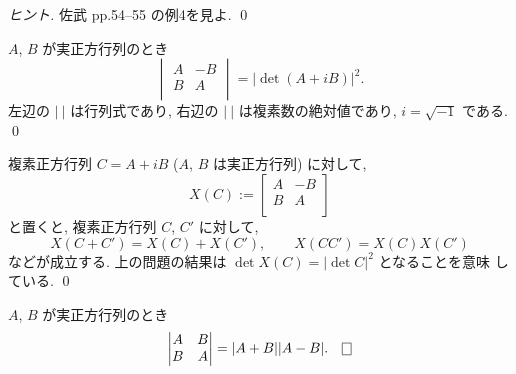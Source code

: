 \documentclass[12pt,twoside]{jarticle}
\begin{document}
\begin{proof}[ヒント]
  佐武 \cite{satake} pp.54--55 の例4を見よ. \qed
\end{proof}


\begin{question}[複素行列を表現する実行列の行列式]
  \label{q:det-A-BBA}
  $A$, $B$ が実正方行列のとき
  \begin{equation*}
    \begin{vmatrix}
      A & -B \\
      B & A  \\
    \end{vmatrix}
    = |\det(A+iB)|^2.
  \end{equation*}
  左辺の $|\ |$ は行列式であり, 
  右辺の $|\ |$ は複素数の絶対値であり, $i=\sqrt{-1}$ である. \qed
\end{question}

\begin{guide}
  複素正方行列 $C = A + iB$ ($A$, $B$ は実正方行列) に対して,
  \begin{equation*}
    X(C) := 
    \begin{bmatrix}
      A & -B \\
      B & A \\
    \end{bmatrix}
  \end{equation*}
  と置くと, 複素正方行列 $C$, $C'$ に対して,
  \begin{equation*}
    X(C+C') = X(C)+X(C'), \qquad X(CC') = X(C)X(C')
  \end{equation*}
  などが成立する. 上の問題の結果は $\det X(C)=|\det C|^2$ となることを意味
  している.  \qed
\end{guide}

\begin{question}
  \label{q:det-ABBA}
  $A$, $B$ が実正方行列のとき
  \begin{equation*}
    \begin{vmatrix}
      A & B \\
      B & A  \\
    \end{vmatrix}
    = |A+B||A-B|.
    \qed
  \end{equation*}
\end{question}

\end{document}
